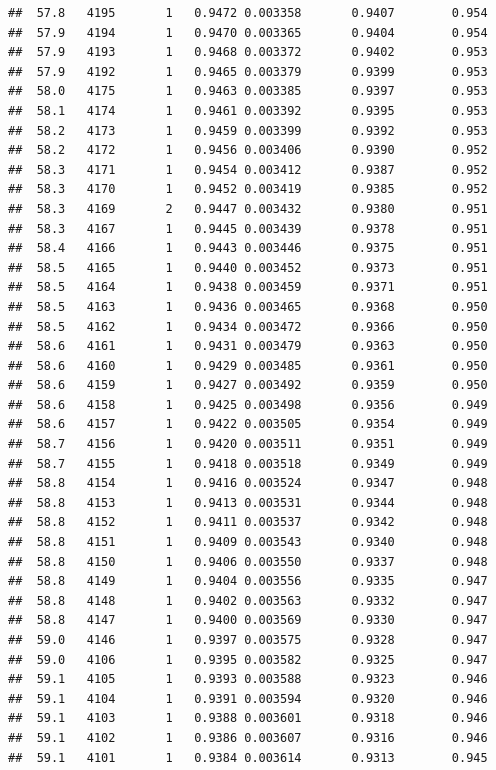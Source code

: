 \documentclass[
]{book}
\begin{document}
\begin{verbatim}
##  57.8   4195       1   0.9472 0.003358       0.9407        0.954
##  57.9   4194       1   0.9470 0.003365       0.9404        0.954
##  57.9   4193       1   0.9468 0.003372       0.9402        0.953
##  57.9   4192       1   0.9465 0.003379       0.9399        0.953
##  58.0   4175       1   0.9463 0.003385       0.9397        0.953
##  58.1   4174       1   0.9461 0.003392       0.9395        0.953
##  58.2   4173       1   0.9459 0.003399       0.9392        0.953
##  58.2   4172       1   0.9456 0.003406       0.9390        0.952
##  58.3   4171       1   0.9454 0.003412       0.9387        0.952
##  58.3   4170       1   0.9452 0.003419       0.9385        0.952
##  58.3   4169       2   0.9447 0.003432       0.9380        0.951
##  58.3   4167       1   0.9445 0.003439       0.9378        0.951
##  58.4   4166       1   0.9443 0.003446       0.9375        0.951
##  58.5   4165       1   0.9440 0.003452       0.9373        0.951
##  58.5   4164       1   0.9438 0.003459       0.9371        0.951
##  58.5   4163       1   0.9436 0.003465       0.9368        0.950
##  58.5   4162       1   0.9434 0.003472       0.9366        0.950
##  58.6   4161       1   0.9431 0.003479       0.9363        0.950
##  58.6   4160       1   0.9429 0.003485       0.9361        0.950
##  58.6   4159       1   0.9427 0.003492       0.9359        0.950
##  58.6   4158       1   0.9425 0.003498       0.9356        0.949
##  58.6   4157       1   0.9422 0.003505       0.9354        0.949
##  58.7   4156       1   0.9420 0.003511       0.9351        0.949
##  58.7   4155       1   0.9418 0.003518       0.9349        0.949
##  58.8   4154       1   0.9416 0.003524       0.9347        0.948
##  58.8   4153       1   0.9413 0.003531       0.9344        0.948
##  58.8   4152       1   0.9411 0.003537       0.9342        0.948
##  58.8   4151       1   0.9409 0.003543       0.9340        0.948
##  58.8   4150       1   0.9406 0.003550       0.9337        0.948
##  58.8   4149       1   0.9404 0.003556       0.9335        0.947
##  58.8   4148       1   0.9402 0.003563       0.9332        0.947
##  58.8   4147       1   0.9400 0.003569       0.9330        0.947
##  59.0   4146       1   0.9397 0.003575       0.9328        0.947
##  59.0   4106       1   0.9395 0.003582       0.9325        0.947
##  59.1   4105       1   0.9393 0.003588       0.9323        0.946
##  59.1   4104       1   0.9391 0.003594       0.9320        0.946
##  59.1   4103       1   0.9388 0.003601       0.9318        0.946
##  59.1   4102       1   0.9386 0.003607       0.9316        0.946
##  59.1   4101       1   0.9384 0.003614       0.9313        0.945

\end{verbatim}
\end{document}
